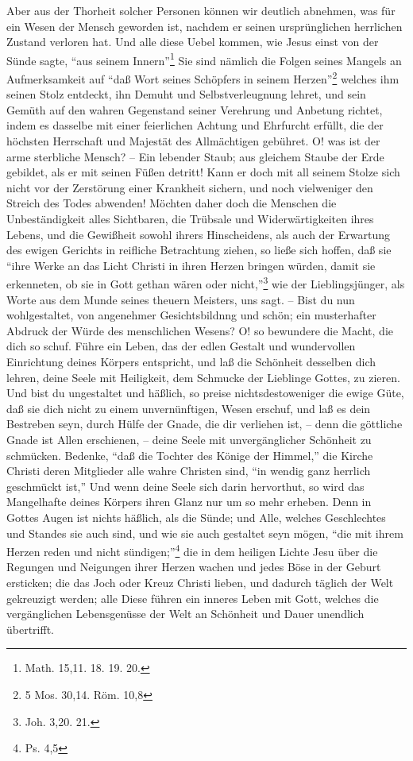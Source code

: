 Aber aus der Thorheit solcher Personen können wir deutlich abnehmen, was für ein Wesen der Mensch geworden ist, nachdem er seinen ursprünglichen herrlichen Zustand verloren hat. Und alle diese Uebel kommen, wie Jesus einst von der Sünde sagte, "`aus seinem Innern"'\footnote{Math. 15,11. 18. 19. 20.} Sie sind nämlich die Folgen seines Mangels an Aufmerksamkeit auf "`daß Wort seines Schöpfers in seinem Herzen"'\footnote{5 Mos. 30,14. Röm. 10,8} welches ihm seinen Stolz entdeckt, ihn Demuht und Selbstverleugnung lehret, und sein Gemüth auf den wahren Gegenstand seiner Verehrung und Anbetung richtet, indem es dasselbe mit einer feierlichen Achtung und Ehrfurcht erfüllt, die der höchsten Herrschaft und Majestät des Allmächtigen gebühret. O! was ist der arme sterbliche Mensch? -- Ein lebender Staub; aus gleichem Staube der Erde gebildet, als er mit seinen Füßen detritt! Kann er doch mit all seinem Stolze sich nicht vor der Zerstörung einer Krankheit sichern, und noch vielweniger den Streich des Todes abwenden! Möchten daher doch die Menschen die Unbeständigkeit alles Sichtbaren, die Trübsale und Widerwärtigkeiten ihres Lebens, und die Gewißheit sowohl ihrers Hinscheidens, als auch der Erwartung des ewigen Gerichts in reifliche Betrachtung ziehen, so ließe sich hoffen, daß sie "`ihre Werke an das Licht Christi in ihren Herzen bringen würden, damit sie erkenneten, ob sie in Gott gethan wären oder nicht,"'\footnote{Joh. 3,20. 21.} wie der Lieblingsjünger, als Worte aus dem Munde seines theuern Meisters, uns sagt. -- Bist du nun wohlgestaltet, von angenehmer Gesichtsbildnng und schön; ein musterhafter Abdruck der Würde des menschlichen Wesens? O! so bewundere die Macht, die dich so schuf. Führe ein Leben, das der edlen Gestalt und wundervollen Einrichtung deines Körpers entspricht, und laß die Schönheit desselben dich lehren, deine Seele mit Heiligkeit, dem Schmucke der Lieblinge Gottes, zu zieren. Und bist du ungestaltet und häßlich, so preise nichtsdestoweniger die ewige Güte, daß sie dich nicht zu einem unvernünftigen, Wesen erschuf, und laß es dein Bestreben seyn, durch Hülfe der Gnade, die dir verliehen ist, -- denn die göttliche Gnade ist Allen erschienen, -- deine Seele mit unvergänglicher Schönheit zu schmücken. Bedenke, "`daß die Tochter des Könige der Himmel,"' die Kirche Christi deren Mitglieder alle wahre Christen sind, "`in wendig ganz herrlich geschmückt ist,"' Und wenn deine Seele sich  darin hervorthut, so wird das Mangelhafte deines Körpers ihren Glanz nur um so mehr erheben. Denn in Gottes Augen ist nichts häßlich, als die Sünde; und Alle, welches Geschlechtes und Standes sie auch sind, und wie sie auch gestaltet seyn mögen, "`die mit ihrem Herzen reden und nicht sündigen;"'\footnote{Ps. 4,5} die in dem heiligen Lichte Jesu über die Regungen und Neigungen ihrer Herzen wachen und jedes Böse in der Geburt ersticken; die das Joch oder Kreuz Christi lieben, und dadurch täglich der Welt gekreuzigt werden; alle Diese führen ein inneres Leben mit Gott, welches die vergänglichen Lebensgenüsse der Welt an Schönheit und Dauer unendlich übertrifft.
